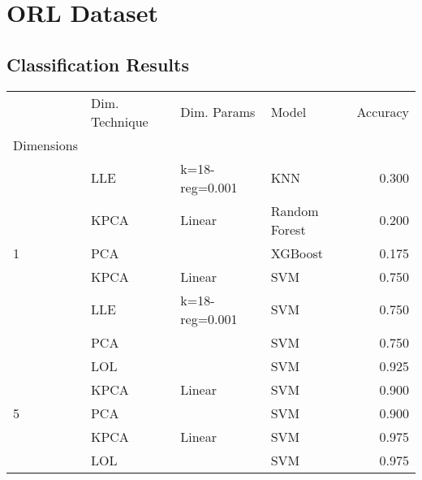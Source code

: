 \section{ORL Dataset}

\subsection{Classification Results}

\begin{table}[!h]
    \begin{tabular}{llllr}
        \toprule
        {}                                       & Dim. Technique & Dim. Params    & Model         & Accuracy \\
        Dimensions                               &                &                &               &          \\
        \midrule
                                                 & LLE            & k=18-reg=0.001 & KNN           & 0.300    \\
                                                 & KPCA           & Linear         & Random Forest & 0.200    \\
        \multirow{-3}{*}{1}                      & PCA            &                & XGBoost       & 0.175    \\
        \rowcolor{lightgray}                     & KPCA           & Linear         & SVM           & 0.750    \\
        \rowcolor{lightgray}                     & LLE            & k=18-reg=0.001 & SVM           & 0.750    \\
        \rowcolor{lightgray}\multirow{-3}{*}{3}  & PCA            &                & SVM           & 0.750    \\
                                                 & LOL            &                & SVM           & 0.925    \\
                                                 & KPCA           & Linear         & SVM           & 0.900    \\
        \multirow{-3}{*}{5}                      & PCA            &                & SVM           & 0.900    \\
        \rowcolor{lightgray}                     & KPCA           & Linear         & SVM           & 0.975    \\
        \rowcolor{lightgray}                     & LOL            &                & SVM           & 0.975    \\

\end{tabular}
\end{table}

